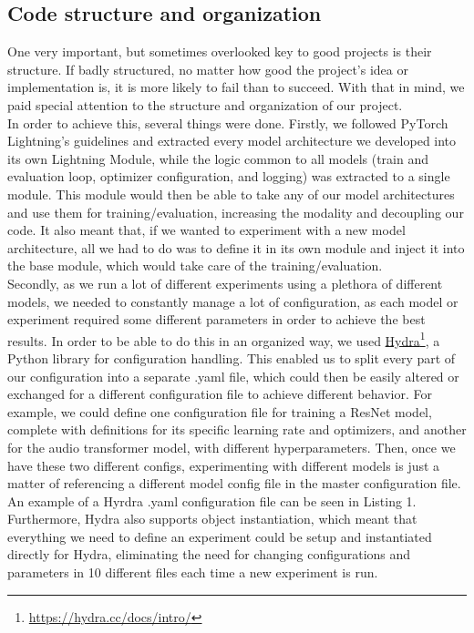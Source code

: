 \documentclass{ol-softwaremanual}
\newcommand{\doclink}[2]{\href{#1}{#2}\footnote{\url{#1}}}
\begin{document}
\subsection{Code structure and organization}
One very important, but sometimes overlooked key to good projects is their
structure. If badly structured, no matter how good the project’s idea or implementation is, it is more likely to fail than to succeed. With that in mind, we
paid special attention to the structure and organization of our project. \\


In order to achieve this, several things were done. Firstly, we followed PyTorch Lightning's guidelines and extracted every model architecture we developed into its own Lightning Module, while the logic common to all models (train and evaluation loop, optimizer configuration, and logging) was extracted to a single module. This module would then be able to take any of our model architectures and use them for training/evaluation, increasing the modality and decoupling our code. It also meant that, if we wanted to experiment with a new model architecture, all we had to do was to define it in its own module and inject it into the base module, which would take care of the training/evaluation. \\

Secondly, as we run a lot of different experiments using a plethora of different models, we needed to constantly manage a lot of configuration, as each model or experiment required some different parameters in order to achieve the best results. In order to be able to do this in an organized way, we used \doclink{https://hydra.cc/docs/intro/}{Hydra}, a Python library for configuration handling. This enabled us to split every part of our configuration into a separate .yaml file, which could then be easily altered or exchanged for a different configuration file to achieve different behavior. For example, we could define one configuration file for training a ResNet model, complete with definitions for its specific learning rate and optimizers, and another for the audio transformer model, with different hyperparameters. Then, once we have these two different configs, experimenting with different models is just a matter of referencing a different model config file in the master configuration file. An example of a Hyrdra .yaml configuration file can be seen in Listing 1. Furthermore, Hydra also supports object instantiation, which meant that everything we need to define an experiment could be setup and instantiated directly for Hydra, eliminating the need for changing configurations and parameters in 10 different files each time a new experiment is run. \\
\end{document}
